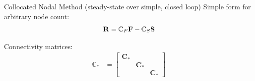 \documentclass[10pt,t,xcolor=table]{beamer}
\begin{document}
    \begin{frame}{Collocated Nodal Method {\small(steady-state over simple, closed loop)}}
        Simple form for arbitrary node count:
        \begin{equation}
            \mathbf{R} = \mathbb{C}_F \mathbf{F} - \mathbb{C}_S \mathbf{S}
        \end{equation}
        
        Connectivity matrices:
        \begin{align}
            \mathbb{C}_* &=  \begin{bmatrix}
                        \mathbf{C}_* & \mathbf{ }   & \mathbf{ } \\
                        \mathbf{ }   & \mathbf{C}_* & \mathbf{ } \\
                        \mathbf{ }   & \mathbf{ }   & \mathbf{C}_* 
                     \end{bmatrix}
            \label{Eqn:SysConnMatrices}
        \end{align}
        

\end{frame}
\end{document}
